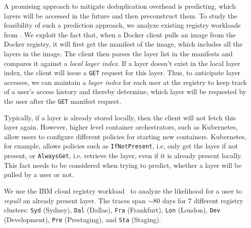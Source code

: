 
%
A promising approach to mitigate deduplication overhead is predicting,
which layers will be accessed in the future and then preconstruct them.
%
%
To study the feasibility of such a prediction approach, we analyze
existing registry workloads from .
%
We exploit the fact that, when a Docker client pulls an image
from the Docker registry, it will first get the manifest of the
image, which includes all the layers in the image.
%
The client then parses the layer list in the manifests
and compares it against a \emph{local layer index}.
%
If a layer doesn't exist in the local layer index, the client will issue a \texttt{GET}
request for this layer.
%
Thus, to anticipate layer accesses, we can maintain a \emph{layer index} for each user
at the registry to keep track of a user's access history and thereby determine, which layer
will be requested by the user after the \texttt{GET} manifest request.
%

Typically, if a layer is already stored locally, then the client will not
fetch this layer again.
%
However, higher level container orchestrators, such as Kubernetes, allow users to configure different policies
for starting new containers. Kubernetes, for example, allows policies such as
\texttt{IfNotPresent}, i.e,  only get the layer if not present, or \texttt{AlwaysGet}, i.e.
retrieve the layer, even if it is already present locally.
%
This fact needs to be considered when trying to predict, whether a layer will
be pulled by a user or not.

We use the IBM cloud registry workload~\cite{dockerworkload} to analyze the likelihood for
a user to \emph{repull} an already present layer.
%
The traces span $\sim$80 days for 7 different registry clusters:
\texttt{Syd} (Sydney), \texttt{Dal} (Dallas), \texttt{Fra} (Frankfurt), \texttt{Lon} (London),
\texttt{Dev} (Development), \texttt{Pre} (Prestaging), and \texttt{Sta} (Staging).
%

